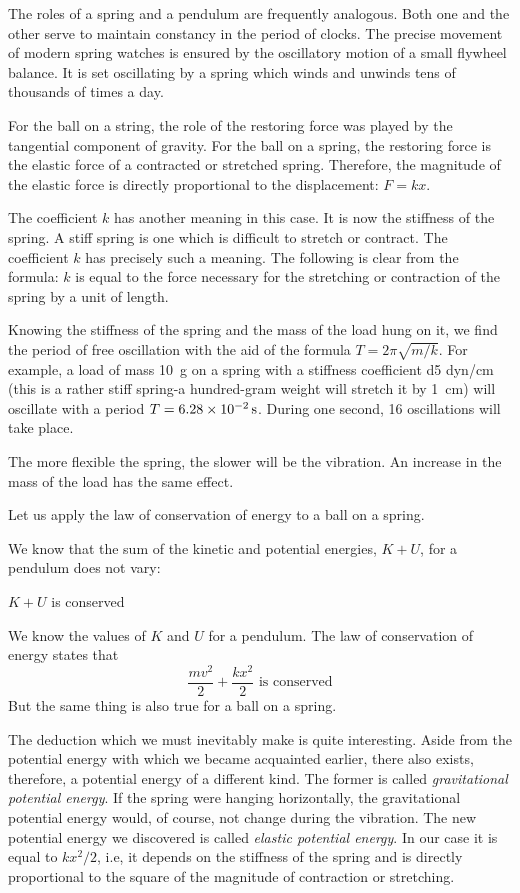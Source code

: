 The roles of a spring and a pendulum are frequently
analogous. Both one and the other serve to maintain constancy in the period of clocks. The precise movement of
modern spring watches is ensured by the oscillatory motion of a small flywheel balance. It is set oscillating by a
spring which winds and unwinds tens of thousands of
times a day.

For the ball on a string, the role of the restoring force
was played by the tangential component of gravity. For
the ball on a spring, the restoring force is the elastic force
of a contracted or stretched spring. Therefore, the magnitude of the elastic force is directly proportional to the
displacement: $F = kx$.

The coefficient $k$ has another meaning in this case. It
is now the stiffness of the spring. A stiff spring is one which
is difficult to stretch or contract. The coefficient $k$ has
precisely such a meaning. The following is clear from the
formula: $k$ is equal to the force necessary for the stretching or contraction of the spring by a unit of length.

Knowing the stiffness of the spring and the mass of
the load hung on it, we find the period of free oscillation
with the aid of the formula $T = 2 \pi \sqrt{m/k}$. For example,
a load of mass \SI{10}{\gram} on a spring with a stiffness coefficient \num{d5} dyn/cm (this is a rather stiff spring-a hundred-gram weight will stretch it by \SI{1}{\centi\meter}) will oscillate with a period $T = \SI{6.28d-2}{\second}$. During one second, 16 oscillations will take place.

The more flexible the spring, the slower will be the
vibration. An increase in the mass of the load has the
same effect.

Let us apply the law of conservation of energy to a ball
on a spring.

We know that the sum of the kinetic and potential
energies, $K + U$, for a pendulum does not vary:

$K + U$ is conserved

We know the values of $K$ and $U$ for a pendulum. The law
of conservation of energy states that
\begin{equation*}%
\frac{mv^{2}}{2} + \frac{kx^{2}}{2} \,\, \textrm{is conserved}
\end{equation*}
But the same thing is also true for a ball on a spring.

The deduction which we must inevitably make is quite
interesting. Aside from the potential energy with which
we became acquainted earlier, there also exists, therefore,
a potential energy of a different kind. The former is called
\emph{gravitational potential energy}. If the spring were hanging
horizontally, the gravitational potential energy would,
of course, not change during the vibration. The new potential energy we discovered is called \emph{elastic potential energy}. In our case it is equal to $kx^{2}/2$, i.e, it depends on the stiffness of the spring and is directly proportional to the square of the magnitude of contraction or stretching.

